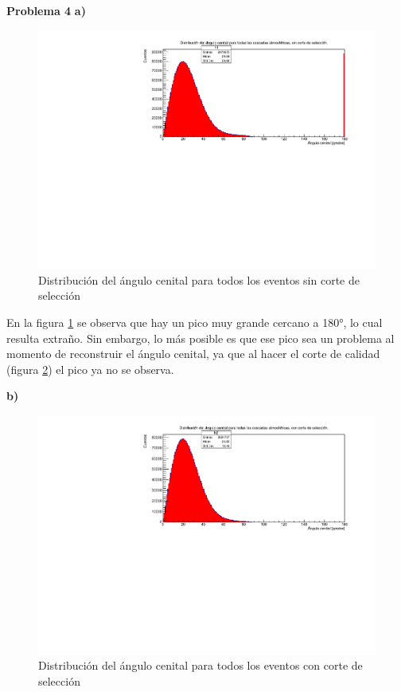\documentclass[11pt]{article}
\begin{document}
\textbf{Problema 4}
\textbf{a)}
\begin{figure}[H]
\centering
\includegraphics[width=1\textwidth]{../Figuras/Prob4A}
\caption{Distribución del ángulo cenital para todos los eventos sin corte de selección}
\label{fig:Prob4A}
\end{figure}
En la figura \ref{fig:Prob4A} se observa que hay un pico muy grande cercano a 180°, lo cual resulta extraño. Sin embargo, lo más posible es que ese pico sea un problema al momento de reconstruir el ángulo cenital, ya que al hacer el corte de calidad (figura \ref{fig:Prob4B}) el pico ya no se observa. 

\textbf{b)}
\begin{figure}[H]
\centering
\includegraphics[width=1\textwidth]{../Figuras/Prob4B}
\caption{Distribución del ángulo cenital para todos los eventos con corte de selección}
\label{fig:Prob4B}
\end{figure}
\pagebreak
\end{document}
